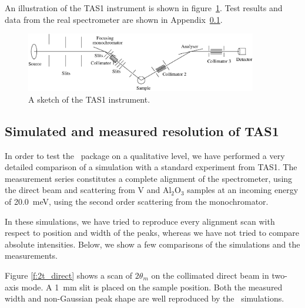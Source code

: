 An illustration of the TAS1 instrument
is shown in figure~\ref{f:TAS1}.
Test results and data from the real spectrometer are shown
in Appendix~\ref{data:TAS1}.

\begin{figure}
  \begin{center}
    \includegraphics[width=0.9\textwidth]{figures/tas1.eps}
  \end{center}
\caption{A sketch of the TAS1 instrument.}
\label{f:TAS1}
\end{figure}

\subsection{Simulated and measured resolution of TAS1}
\label{data:TAS1}

In order to test the \MCS\ package on a qualitative level,
we have performed a very detailed comparison of a simulation with a
standard experiment from TAS1. The measurement series
constitutes a complete alignment of the spectrometer,
using the direct beam and scattering from V and Al$_2$O$_3$
samples at an incoming energy of 20.0~meV, using the second order
scattering from the monochromator.

In these simulations, we have tried to reproduce
every alignment scan with respect to position and width
of the peaks, whereas we have not tried to compare
absolute intensities. Below, we show a few comparisons
of the simulations and the measurements.

Figure \ref{f:2t_direct} shows a scan of
$2\theta_m$ on the collimated direct beam in two-axis mode.
A \hbox{1 mm} slit is placed on the sample position.
Both the measured width and non-Gaussian peak shape
are well reproduced by the \MCS\ simulations.

